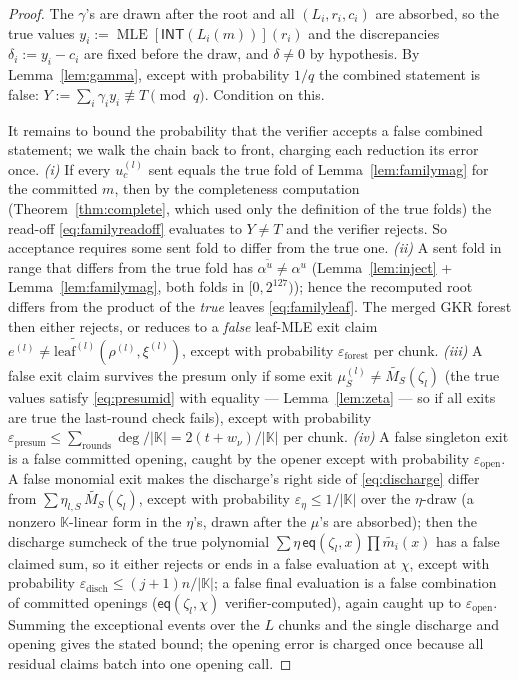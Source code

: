 \documentclass[11pt]{article}
\newcommand{\K}{\mathbb{K}}            %
\newcommand{\INT}{\mathsf{INT}}
\newcommand{\mle}[1]{\widetilde{#1}}
\newcommand{\eq}{\mathsf{eq}}
\DeclareMathOperator{\MLE}{MLE}
\theoremstyle{plain}
\theoremstyle{definition}
\theoremstyle{remark}
\begin{document}
\begin{proof}
The $\gamma$'s are drawn after the root and all $(L_i,r_i,c_i)$ are absorbed,
so the true values $y_i:=\MLE[\INT(L_i(m))](r_i)$ and the discrepancies
$\delta_i:=y_i-c_i$ are fixed before the draw, and $\delta\ne 0$ by
hypothesis. By Lemma~\ref{lem:gamma}, except with probability $1/q$ the
combined statement is false:
$Y:=\sum_i\gamma_iy_i\not\equiv T\pmod q$. Condition on this.

It remains to bound the probability that the verifier accepts a false
combined statement; we walk the chain back to front, charging each reduction
its error once.
\emph{(i)} If every $u^{(l)}_c$ sent equals the true fold of
Lemma~\ref{lem:familymag} for the committed $m$, then by the completeness
computation (Theorem~\ref{thm:complete}, which used only the definition of
the true folds) the read-off \eqref{eq:familyreadoff} evaluates to
$Y\ne T$ and the verifier rejects. So acceptance requires some sent fold to
differ from the true one.
\emph{(ii)} A sent fold in range that differs from the true fold has
$\alpha^{\tilde u}\ne\alpha^{u}$ (Lemma~\ref{lem:inject} +
Lemma~\ref{lem:familymag}, both folds in $[0,2^{127})$); hence the
recomputed root differs from the product of the \emph{true} leaves
\eqref{eq:familyleaf}. The merged GKR forest then either rejects, or reduces
to a \emph{false} leaf-MLE exit claim
$e^{(l)}\ne\mle{\mathrm{leaf}^{(l)}}(\rho^{(l)},\xi^{(l)})$, except with
probability $\varepsilon_{\mathrm{forest}}$ per chunk.
\emph{(iii)} A false exit claim survives the presum only if some exit
$\mu^{(l)}_S\ne\mle{M_S}(\zeta_l)$ (the true values satisfy
\eqref{eq:presumid} with equality --- Lemma~\ref{lem:zeta} --- so if all
exits are true the last-round check fails), except with probability
$\varepsilon_{\mathrm{presum}}\le\sum_{\text{rounds}}\deg/|\K|
= 2(t+w_\nu)/|\K|$ per chunk.
\emph{(iv)} A false singleton exit is a false committed opening, caught by
the opener except with probability $\varepsilon_{\mathrm{open}}$. A false
monomial exit makes the discharge's right side of \eqref{eq:discharge}
differ from $\sum\eta_{l,S}\,\mle{M_S}(\zeta_l)$, except with probability
$\varepsilon_{\eta}\le 1/|\K|$ over the $\eta$-draw (a nonzero
$\K$-linear form in the $\eta$'s, drawn after the $\mu$'s are absorbed);
then the discharge sumcheck of the true polynomial
$\sum\eta\,\eq(\zeta_l,x)\prod\mle{m_i}(x)$ has a false claimed sum, so it
either rejects or ends in a false evaluation at $\chi$, except with
probability $\varepsilon_{\mathrm{disch}}\le (j{+}1)n/|\K|$; a false final
evaluation is a false combination of committed openings
($\eq(\zeta_l,\chi)$ verifier-computed), again caught up to
$\varepsilon_{\mathrm{open}}$.
Summing the exceptional events over the $L$ chunks and the single discharge
and opening gives the stated bound; the opening error is charged once because
all residual claims batch into one opening call.
\end{proof}
\end{document}

